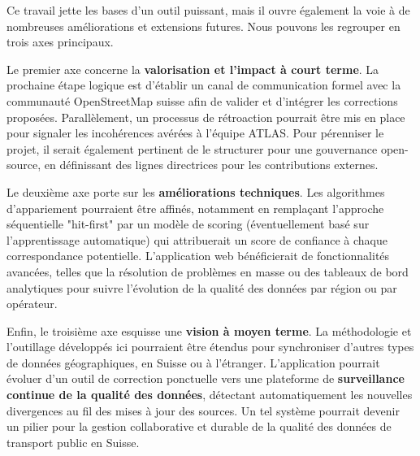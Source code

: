 Ce travail jette les bases d'un outil puissant, mais il ouvre également la voie à de nombreuses améliorations et extensions futures. Nous pouvons les regrouper en trois axes principaux.

Le premier axe concerne la \textbf{valorisation et l'impact à court terme}. La prochaine étape logique est d'établir un canal de communication formel avec la communauté OpenStreetMap suisse afin de valider et d'intégrer les corrections proposées. Parallèlement, un processus de rétroaction pourrait être mis en place pour signaler les incohérences avérées à l'équipe ATLAS. Pour pérenniser le projet, il serait également pertinent de le structurer pour une gouvernance open-source, en définissant des lignes directrices pour les contributions externes.

Le deuxième axe porte sur les \textbf{améliorations techniques}. Les algorithmes d'appariement pourraient être affinés, notamment en remplaçant l'approche séquentielle "hit-first" par un modèle de scoring (éventuellement basé sur l'apprentissage automatique) qui attribuerait un score de confiance à chaque correspondance potentielle. L'application web bénéficierait de fonctionnalités avancées, telles que la résolution de problèmes en masse ou des tableaux de bord analytiques pour suivre l'évolution de la qualité des données par région ou par opérateur.

Enfin, le troisième axe esquisse une \textbf{vision à moyen terme}. La méthodologie et l'outillage développés ici pourraient être étendus pour synchroniser d'autres types de données géographiques, en Suisse ou à l'étranger. L'application pourrait évoluer d'un outil de correction ponctuelle vers une plateforme de \textbf{surveillance continue de la qualité des données}, détectant automatiquement les nouvelles divergences au fil des mises à jour des sources. Un tel système pourrait devenir un pilier pour la gestion collaborative et durable de la qualité des données de transport public en Suisse.

